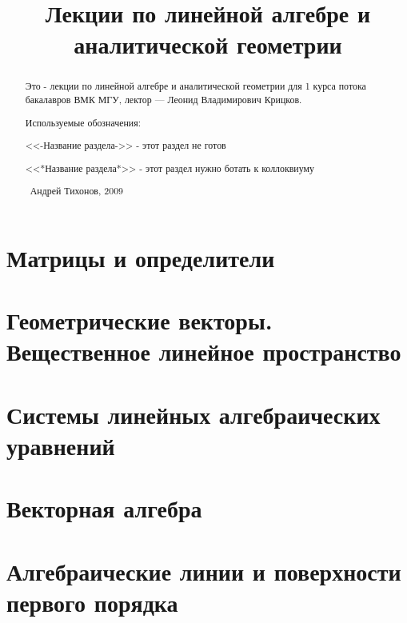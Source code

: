 \documentclass[draft]{report}
\title{Лекции по линейной алгебре и аналитической геометрии}
\theoremstyle{remark}
\begin{document}
\maketitle
\begin{abstract}
Это - лекции по линейной алгебре и аналитической геометрии для 1 курса потока бакалавров ВМК МГУ, лектор --- Леонид Владимирович Крицков.

Используемые обозначения:

<<-Название раздела->> - этот раздел не готов

<<*Название раздела*>> - этот раздел нужно ботать к коллоквиуму

\textcopyright\ Андрей Тихонов, 2009
\end{abstract}
\tableofcontents
\part{Матрицы и определители}

\part{Геометрические векторы. Вещественное линейное пространство}

\part{Системы линейных алгебраических уравнений}

\part{Векторная алгебра}

\part{Алгебраические линии и поверхности первого порядка}

\end{document}
